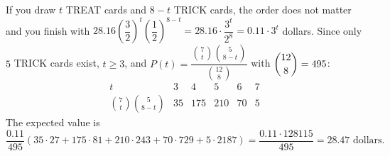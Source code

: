 If you draw $t$ TREAT cards and $8-t$ TRICK cards, the order does not matter and you finish with $28.16\left(\dfrac{3}{2}\right)^t\left(\dfrac{1}{2}\right)^{8-t}=28.16\cdot\dfrac{3^t}{2^8}=0.11\cdot3^t$ dollars. Since only $5$ TRICK cards exist, $t\ge3$, and $P(t)=\dfrac{\binom7t\binom{5}{8-t}}{\binom{12}{8}}$ with $\dbinom{12}{8}=495$:
\[
\begin{array}{c|ccccc}
t&3&4&5&6&7\\\hline
\binom7t\binom5{8-t}&35&175&210&70&5
\end{array}
\]
The expected value is
\[
\dfrac{0.11}{495}\left(35\cdot27+175\cdot81+210\cdot243+70\cdot729+5\cdot2187\right)=\dfrac{0.11\cdot128115}{495}=\boxed{28.47\text{ dollars}}.
\]
